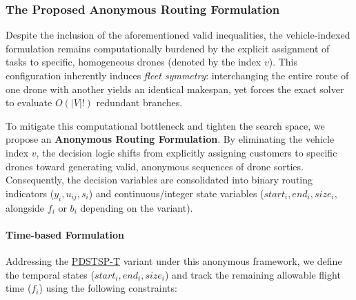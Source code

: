 \documentclass[3p, authoryear, 11pt]{elsarticle}
\begin{document}
\subsubsection{The Proposed Anonymous Routing Formulation}
\label{sec:cp_anonymous}

Despite the inclusion of the aforementioned valid inequalities, the vehicle-indexed formulation remains computationally burdened by the explicit assignment of tasks to specific, homogeneous drones (denoted by the index $v$). This configuration inherently induces \textit{fleet symmetry}: interchanging the entire route of one drone with another yields an identical makespan, yet forces the exact solver to evaluate $O(|V|!)$ redundant branches.

To mitigate this computational bottleneck and tighten the search space, we propose an \textbf{Anonymous Routing Formulation}. By eliminating the vehicle index $v$, the decision logic shifts from explicitly assigning customers to specific drones toward generating valid, anonymous sequences of drone sorties. Consequently, the decision variables are consolidated into binary routing indicators ($y_i, u_{ij}, s_i$) and continuous/integer state variables ($start_i, end_i, size_i$, alongside $f_i$ or $b_i$ depending on the variant). 

\paragraph{Time-based Formulation} 
Addressing the \hyperref[sec:time_model_des]{PDSTSP-T} variant under this anonymous framework, we define the temporal states ($start_i, end_i, size_i$) and track the remaining allowable flight time ($f_i$) using the following constraints:
\end{document}
